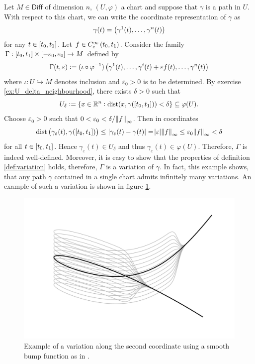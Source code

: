 \begin{example}
	\label{ex:perturbation_along_single_direction}
	Let $M \in \mathsf{Diff}$ of dimension $n$, $(U,\varphi)$ a chart and suppose that $\gamma$ is a path in $U$. With respect to this chart, we can write the coordinate representation of $\gamma$ as
	\begin{equation*}
		\gamma(t) = \del[1]{\gamma^1(t),\dots,\gamma^n(t)}
	\end{equation*}
	\noindent for any $t \in \intcc[0]{t_0,t_1}$. Let $f \in C^\infty_c\intoo[0]{t_0,t_1}$. Consider the family $\Gamma : \intcc[0]{t_0,t_1} \times \intcc[0]{-\varepsilon_0,\varepsilon_0} \to M$ defined by
	\begin{equation*}
		\Gamma(t,\varepsilon) := (\iota \circ \varphi^{-1})\del[1]{\gamma^1(t),\dots,\gamma^i(t) + \varepsilon f(t),\dots,\gamma^n(t)}
	\end{equation*}
	\noindent where $\iota : U \hookrightarrow M$ denotes inclusion and $\varepsilon_0 > 0$ is to be determined. By exercise \ref{ex:U_delta_neighbourhood}, there exists $\delta > 0$ such that
	\begin{equation*}
		U_\delta := \cbr[0]{x \in \mathbb{R}^n : \dist(x,\gamma(\intcc[0]{t_0,t_1})) < \delta} \subseteq \varphi(U).
	\end{equation*}
	Choose $\varepsilon_0 > 0$ such that $0 < \varepsilon_0 < \delta/\norm{f}_\infty$. Then in coordinates
	\begin{equation*}
		\dist\del[1]{\gamma_\varepsilon(t), \gamma(\intcc[0]{t_0,t_1})} \leq \abs[0]{\gamma_\varepsilon(t) - \gamma(t)} = \abs{\varepsilon} \norm{f}_\infty \leq \varepsilon_0 \norm{f}_\infty < \delta 
	\end{equation*}
	\noindent for all $t \in \intcc[0]{t_0,t_1}$. Hence $\gamma_\varepsilon(t) \in U_\delta$ and thus $\gamma_\varepsilon(t) \in \varphi(U)$. Therefore, $\Gamma$ is indeed well-defined. Moreover, it is easy to show that the properties of definition \ref{def:variation} holds, therefore, $\Gamma$ is a variation of $\gamma$. In fact, this example shows, that any path $\gamma$ contained in a single chart admits infinitely many variations. An example of such a variation is shown in figure \ref{fig:variation}.

	\begin{figure}[h!tb]
		\centering
		\includegraphics[width = .7\textwidth]{variation.pdf}
		\caption{Example of a variation along the second coordinate using a smooth bump function as in \cite[42]{lee:smooth_manifolds:2013}.}
		\label{fig:variation}
	\end{figure}
\end{example}

